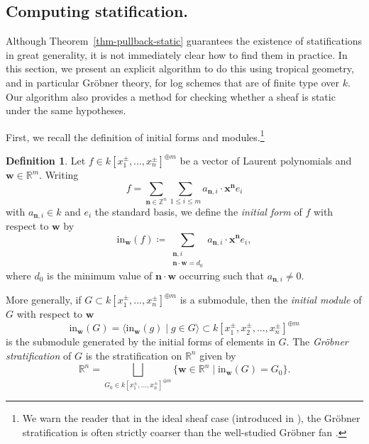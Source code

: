 \documentclass[11pt]{amsart}
\theoremstyle{definition}
\theoremstyle{definition}
\newtheorem{definition}[theorem]{Definition}
\begin{document}
\subsection{Computing statification.}
Although Theorem~\ref{thm-pullback-static} guarantees the existence of statifications in great generality, it is not immediately clear how to find them in practice. In this section, we present an explicit algorithm to do this using tropical geometry, and in particular Gröbner theory, for log schemes that are of finite type over $k$. Our algorithm also provides a method for checking whether a sheaf is static under the same hypotheses.

First, we recall the definition of initial forms and modules.\footnote{We warn the reader that in the ideal sheaf case (introduced in \cite{Cartwright}), the Gr\"obner stratification is often strictly coarser than the well-studied Gr\"obner fan \cite{MaclaganSturmfels}.}
\begin{definition}
Let $f\in k[x_1^{\pm},...,x_{n}^{\pm}]^{\oplus m}$ be a vector of Laurent polynomials and $\mathbf{w}\in \mathbb{R}^m$. Writing 
$$f=\sum_{\mathbf{n}\in \mathbb{Z}^n}\sum_{1\leq i\leq m} a_{\mathbf{n},i}\cdot \mathbf{x}^\mathbf{n}e_i$$ with $a_{\mathbf{n},i}\in k$ and $e_i$ the standard basis, we define the \textit{initial form} of $f$ with respect to $\mathbf{w}$ by
$$\text{in}_\mathbf{w}(f)\coloneqq \sum_{\substack{\mathbf{n}, i \\ \mathbf{n}\cdot \mathbf{w} = d_0}} a_{\mathbf{n},i}\cdot\mathbf{x}^\mathbf{n}e_i,$$
where $d_0$ is the minimum value of $\mathbf{n}\cdot \mathbf{w}$ occurring such that $a_{\mathbf{n},i}\neq 0$.

More generally, if $G\subset k[x_1^{\pm},...,x_{n}^{\pm}]^{\oplus m}$ is a submodule, then the \textit{initial module} of $G$ with respect to $\mathbf{w}$ $$\text{in}_\mathbf{w}(G) = \langle \text{in}_\mathbf{w}(g) \mid g\in G\rangle \subset k[x_1^{\pm},x_2^{\pm},...,x_{n}^{\pm}]^{\oplus m}$$ is the submodule generated by the initial forms of elements in $G$. The \textit{Gröbner stratification} of $G$ is the stratification on $\mathbb{R}^n$ given by 
$$\mathbb{R}^n = \bigsqcup_{G_0\in k[x_1^{\pm},...,x_{n}^{\pm}]^{\oplus m}} \{\mathbf{w}\in \mathbb{R}^n\mid \text{in}_{\mathbf{w}}(G) = G_0\}.$$
\end{definition}
\end{document}
